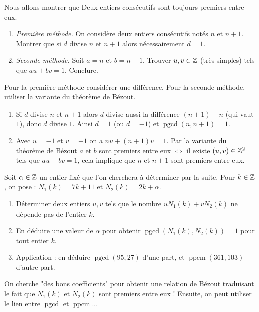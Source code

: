 \documentclass[11pt,class=report,crop=false]{standalone}
\newcommand{\pgcd}{\mathop{\mathrm{pgcd}}\nolimits}
\newcommand{\ppcm}{\mathop{\mathrm{ppcm}}\nolimits}
\begin{document}
\exercice{}
\enonce
Nous allons montrer que \og{}Deux entiers consécutifs sont toujours premiers entre eux.\fg{}
\begin{enumerate}
    \item \emph{Première méthode.} On considère deux entiers consécutifs notés $n$ et $n+1$. Montrer que si $d$ divise $n$ et $n+1$ alors nécessairement $d=1$. 
    
    \item \emph{Seconde méthode.} Soit $a=n$ et $b=n+1$. Trouver $u,v \in \mathbb{Z}$ (très simples) tels que $au+bv=1$. Conclure.
\end{enumerate} 
\finenonce

\indication
Pour la première méthode considérer une différence.
Pour la seconde méthode, utiliser la variante du théorème de Bézout.
\finindication

\correction
\sauteligne
\begin{enumerate}
    \item Si $d$ divise $n$ et $n+1$ alors $d$ divise aussi la différence $(n+1) - n$ (qui vaut $1$), donc $d$ divise $1$. Ainsi $d=1$ (ou $d=-1$) et $\pgcd(n,n+1)=1$.
    
    \item Avec $u=-1$ et $v=+1$ on a $nu+(n+1)v=1$. Par la variante du théorème de Bézout \og{}$a$ et $b$ sont premiers entre eux $\iff$ il existe $(u,v) \in \mathbb{Z}^2$ tels que $au+bv=1$\fg{}, cela implique que $n$ et $n+1$ sont premiers entre eux.
\end{enumerate}
\fincorrection
\finexercice



\exercice{}
\enonce
Soit $\alpha \in \mathbb{Z}$ un entier fixé que l'on cherchera à déterminer par la suite. Pour $k \in \mathbb{Z}$, on pose : $N_1(k) = 7k+11$ et $N_2(k) = 2k + \alpha$.
\begin{enumerate}
    \item Déterminer deux entiers $u,v$ tels que le nombre $u N_1(k) + v N_2(k)$ ne dépende pas de l'entier $k$.
    
    \item En déduire une valeur de $\alpha$ pour obtenir $\pgcd(N_1(k) , N_2(k)) = 1$ pour tout entier $k$.
    
    \item Application : en déduire $\pgcd(95,27)$ d'une part, et $\ppcm(361,103)$ d'autre part.
\end{enumerate}
\finenonce

\indication
On cherche "des bons coefficients" pour obtenir une relation de Bézout traduisant le fait que $N_1(k)$ et $N_2(k)$ sont premiers entre eux ! Ensuite, on peut utiliser le lien entre $\pgcd$ et $\ppcm$...
\finindication
\end{document}
